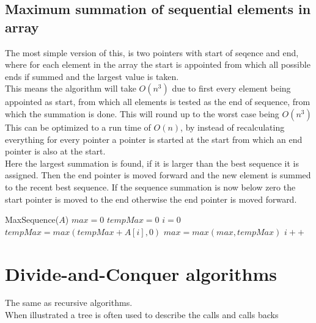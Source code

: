 \documentclass[12pt, a4paper]{article}
\begin{document}
			\subsection{Maximum summation of sequential elements in array}
				The most simple version of this, is two pointers with start of seqence and end, where for each element in the array the start is appointed from which all possible ends if summed and the largest value is taken.\\
				This means the algorithm will take $O(n^3)$ due to first every element being appointed as start, from which all elements is tested as the end of sequence, from which the summation is done. This will round up to the worst case being $O(n^3)$\\
				This can be optimized to a run time of $O(n)$, by instead of recalculating everything for every pointer a pointer is started at the start from which an end pointer is also at the start.\\
				Here the largest summation is found, if it is larger than the best sequence it is assigned. Then the end pointer is moved forward and the new element is summed to the recent best sequence. If the sequence summation is now below zero the start pointer is moved to the end otherwise the end pointer is moved forward.
				\begin{algorithmic}[1]
					\State MaxSequence($A$)
					\State $max = 0$
					\State $tempMax = 0$
					\State $i = 0$
					\While {$i<A.length$}
						\State $tempMax = max(tempMax + A[i], 0)$
						\State $max = max(max, tempMax)$
						\State $i++$
					\EndWhile
				\end{algorithmic}
		\section{Divide-and-Conquer algorithms}
			The same as recursive algorithms.\\
			When illustrated a tree is often used to describe the calls and calls backs
				
	
				
\end{document}
